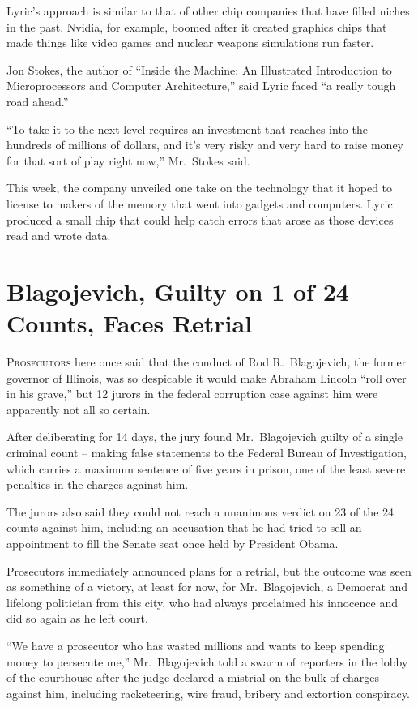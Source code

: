 ﻿\documentclass[12pt]{article}
\begin{document}
Lyric's approach is similar to that of other chip companies that have filled niches in the past.
Nvidia, for example, boomed after it created graphics chips that made things like video games and
nuclear weapons simulations run faster.

Jon Stokes, the author of ``Inside the Machine: An Illustrated Introduction to Microprocessors and
Computer Architecture,'' said Lyric faced ``a really tough road ahead.''

``To take it to the next level requires an investment that reaches into the hundreds of millions of
dollars, and it's very risky and very hard to raise money for that sort of play right now,''
Mr.~Stokes said.

This week, the company unveiled one take on the technology that it hoped to license to makers of the
memory that went into gadgets and computers. Lyric produced a small chip that could help catch
errors that arose as those devices read and wrote data.

\section{Blagojevich, Guilty on 1 of 24 Counts, Faces Retrial}

\lettrine{P}{rosecutors} here once said that the conduct of Rod
R.~Blagojevich, the former governor of Illinois, was so despicable it would make Abraham Lincoln
``roll over in his grave,'' but 12 jurors in the federal corruption case against him were apparently
not all so certain.

After deliberating for 14 days, the jury found Mr.~Blagojevich guilty of a single criminal count --
making false statements to the Federal Bureau of Investigation, which carries a maximum sentence of
five years in prison, one of the least severe penalties in the charges against him.

The jurors also said they could not reach a unanimous verdict on 23 of the 24 counts against him,
including an accusation that he had tried to sell an appointment to fill the Senate seat once held
by President Obama.

Prosecutors immediately announced plans for a retrial, but the outcome was seen as something of a
victory, at least for now, for Mr.~Blagojevich, a Democrat and lifelong politician from this city,
who had always proclaimed his innocence and did so again as he left court.

``We have a prosecutor who has wasted millions and wants to keep spending money to persecute me,''
Mr.~Blagojevich told a swarm of reporters in the lobby of the courthouse after the judge declared a
mistrial on the bulk of charges against him, including racketeering, wire fraud, bribery and
extortion conspiracy.
\end{document}
